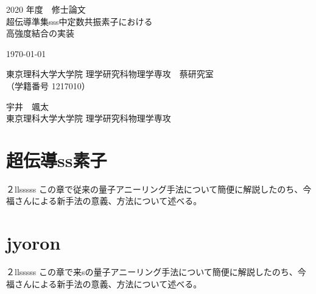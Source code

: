 \documentclass[uplatex,openany,oneside,a4j,11pt]{jsbook}
\begin{document}
\begin{titlepage}
    \begin{center}
        {\Large 2020 年度　修士論文}\\
        \vspace{180truept}
        {\Huge 超伝導準集sss中定数共振素子における\\
        \vspace{10truept}
        高強度結合の実装}\\ 
        \vspace{70truept}

        {\Large \today}\\

        \vspace{70truept}

        {\Large 東京理科大学大学院 理学研究科物理学専攻　蔡研究室\\
        （学籍番号 1217010）}\\

        \vspace{20truept}

        {\huge 宇井　颯太}\\

        \vspace{160truept}
        {\Large 東京理科大学大学院 理学研究科物理学専攻}\\
    \end{center}
\end{titlepage}

\tableofcontents

\chapter{超伝導ss素子}
        ２llsssss
        この章で従来の\cite{nakamura1999coherent}量子アニーリング手法について簡便に解説したのち、今福さんによる新手法の意義、方法について述べる。\\
    

\chapter{jyoron}
    ２llsssss
    この章で\cite{Coon1965}来sの\cite{nakamura1999coherent}量子アニーリング手法について簡便に解説したのち、今福さんによる新手法の意義、方法について述べる。\\
    
\end{document}
